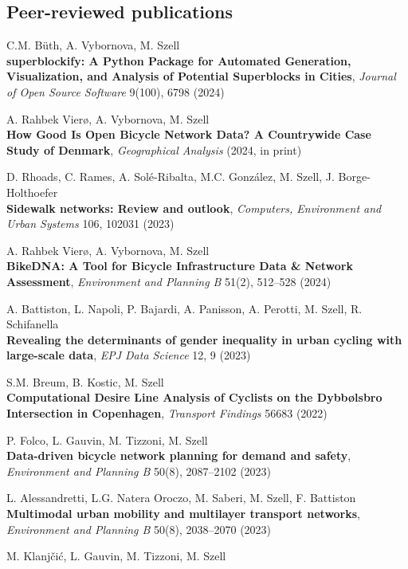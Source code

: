 \documentclass[10pt,a4paper]{article}
\renewenvironment{itemize}{
  \begin{list}{}{
    \setlength{\leftmargin}{1.5em}
    \setlength{\itemsep}{0.25em}
    \setlength{\parskip}{0pt}
    \setlength{\parsep}{0.25em}
  }
}{
  \end{list}
}
\begin{document}
\subsection*{Peer-reviewed publications}
\begin{itemize}
\setlength\itemsep{1em}
\item C.M. Büth, A. Vybornova, M. Szell\\
    \textbf{superblockify: A Python Package for Automated Generation, Visualization, and Analysis of Potential Superblocks in Cities}, \textit{Journal of Open Source Software} 9(100), 6798 (2024)
\item A. Rahbek Vierø, A. Vybornova, M. Szell\\
    \textbf{How Good Is Open Bicycle Network Data? A Countrywide Case Study of Denmark}, \textit{Geographical Analysis} (2024, in print)
\item D. Rhoads, C. Rames, A. Solé-Ribalta, M.C. González, M. Szell, J. Borge-Holthoefer\\
    \textbf{Sidewalk networks: Review and outlook}, \textit{Computers, Environment and Urban Systems} 106, 102031 (2023)
\item A. Rahbek Vierø, A. Vybornova, M. Szell\\
    \textbf{BikeDNA: A Tool for Bicycle Infrastructure Data \& Network Assessment}, \textit{Environment and Planning B} 51(2), 512--528 (2024)
\item A. Battiston, L. Napoli, P. Bajardi, A. Panisson, A. Perotti, M. Szell, R. Schifanella\\
    \textbf{Revealing the determinants of gender inequality in urban cycling with large-scale data}, \textit{EPJ Data Science} 12, 9 (2023)
\item S.M. Breum, B. Kostic, M. Szell\\
    \textbf{Computational Desire Line Analysis of Cyclists on the Dybbølsbro Intersection in Copenhagen}, \textit{Transport Findings} 56683 (2022)
\item P. Folco, L. Gauvin, M. Tizzoni, M. Szell\\
    \textbf{Data-driven bicycle network planning for demand and safety}, \textit{Environment and Planning B} 50(8), 2087--2102 (2023)
\item L. Alessandretti, L.G. Natera Oroczo, M. Saberi, M. Szell, F. Battiston\\
    \textbf{Multimodal urban mobility and multilayer transport networks}, \textit{Environment and Planning B} 50(8), 2038--2070 (2023)
\item M. Klanjčić, L. Gauvin, M. Tizzoni, M. Szell\\

\end{itemize}
\end{document}
